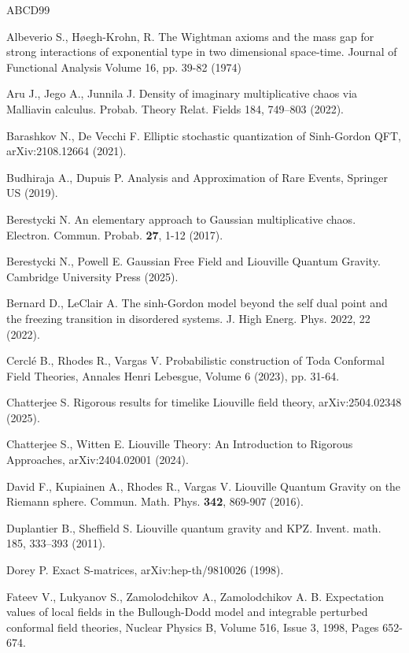 \documentclass[11pt]{article}
\numberwithin{equation}{section}
\theoremstyle{definition}
\begin{document}
\begin{thebibliography}{ABCD99}

 Albeverio S., Høegh-Krohn, R. The Wightman axioms and the mass gap for strong interactions of exponential type in two dimensional space-time. Journal of Functional Analysis Volume 16, pp. 39-82 (1974)

 Aru J., Jego A., Junnila J. Density of imaginary multiplicative chaos via Malliavin calculus. Probab. Theory Relat. Fields 184, 749–803 (2022).

 Barashkov N., De Vecchi F. Elliptic stochastic quantization of Sinh-Gordon QFT, 	arXiv:2108.12664 (2021).

 Budhiraja A., Dupuis P. Analysis and Approximation of Rare Events, Springer US (2019).


Berestycki N. An elementary approach to Gaussian multiplicative chaos. Electron. Commun. Probab. \textbf{27}, 1-12 (2017).

Berestycki N., Powell E. Gaussian Free Field and Liouville Quantum Gravity. Cambridge University Press (2025).

 Bernard D., LeClair A. The sinh-Gordon model beyond the self dual point and the freezing transition in disordered systems. J. High Energ. Phys. 2022, 22 (2022).

 Cercl\'{e} B., Rhodes R., Vargas V. Probabilistic construction of Toda Conformal Field Theories, Annales Henri Lebesgue, Volume 6 (2023), pp. 31-64.

 Chatterjee S. Rigorous results for timelike Liouville field theory, arXiv:2504.02348 (2025).

 Chatterjee S., Witten E. Liouville Theory: An Introduction to Rigorous Approaches, arXiv:2404.02001 (2024).

David F., Kupiainen A., Rhodes R., Vargas V. Liouville Quantum Gravity on the Riemann sphere. Commun. Math. Phys. \textbf{342}, 869-907 (2016).

 Duplantier B., Sheffield S. Liouville quantum gravity and KPZ. Invent. math. 185, 333–393 (2011).

 Dorey P. Exact S-matrices, arXiv:hep-th/9810026 (1998).


 Fateev V., Lukyanov S., Zamolodchikov A., Zamolodchikov A. B. Expectation values of local fields in the Bullough-Dodd model and integrable perturbed conformal field theories, Nuclear Physics B, Volume 516, Issue 3, 1998, Pages 652-674.


\end{thebibliography}
\end{document}
